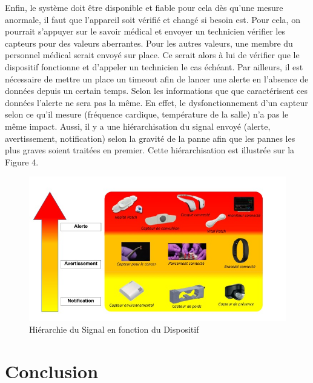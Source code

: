 \documentclass{article}
\begin{document}
Enfin, le système doit être disponible et fiable pour cela dès qu’une mesure anormale, il faut que l’appareil soit vérifié et changé si besoin est. Pour cela, on pourrait s’appuyer sur le savoir médical et envoyer un technicien vérifier les capteurs pour des valeurs aberrantes. Pour les autres valeurs, une membre du personnel médical serait envoyé sur place. Ce serait alors à lui de vérifier que le dispositif fonctionne et d’appeler un technicien le cas échéant. Par ailleurs, il est nécessaire de mettre un place un timeout afin de lancer une alerte en l’absence de données depuis un certain temps. Selon les informations que que caractérisent ces données l’alerte ne sera pas la même. En effet, le dysfonctionnement d’un capteur selon ce qu’il mesure (fréquence cardique, température de la salle) n’a pas le même impact. Aussi, il y a une hiérarchisation du signal envoyé (alerte, avertissement, notification) selon la gravité de la panne afin que les pannes les plus graves soient traitées en premier. Cette hiérarchisation est illustrée sur la Figure 4.

\begin{figure}[h!]
	\hspace*{-2.5cm}
	\centering
	\includegraphics[width=1.5\textwidth]{Figure4.jpg}
	\caption{Hiérarchie du Signal en fonction du Dispositif}
	\label{fig:balance}
\end{figure}


\section{ Conclusion }
 







\end{document}
